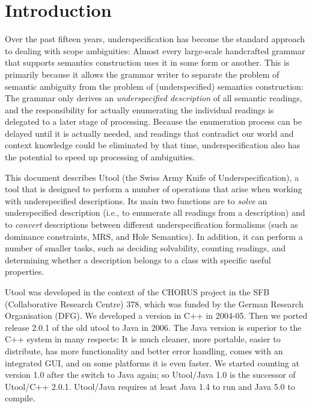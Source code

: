 
\section{Introduction}  \label{sec:introduction}

Over the past fifteen years, underspecification has become the
standard approach to dealing with scope ambiguities: Almost every
large-scale handcrafted grammar that supports semantics construction
uses it in some form or another. This is primarily because it allows
the grammar writer to separate the problem of semantic ambiguity from
the problem of (underspecified) semantics construction: The grammar
only derives an \emph{underspecified description} of all semantic
readings, and the responsibility for actually enumerating the
individual readings is delegated to a later stage of
processing. Because the enumeration process can be delayed until it is
actually needed, and readings that contradict our world and context
knowledge could be eliminated by that time, underspecification also
has the potential to speed up processing of ambiguities.

This document describes Utool (the Swiss Army Knife of
Underspecification), a tool that is designed to perform a number of
operations that arise when working with underspecified
descriptions. Its main two functions are to \emph{solve} an
underspecified description (i.e., to enumerate all readings from a
description) and to \emph{convert} descriptions between different
underspecification formalisms (such as dominance constraints, MRS, and
Hole Semantics). In addition, it can perform a number of smaller
tasks, such as deciding solvability, counting readings, and
determining whether a description belongs to a class with specific
useful properties.

Utool was developed in the context of the CHORUS project in the SFB
(Collaborative Research Centre) 378, which was funded by the German
Research Organisation (DFG). We developed a version in C++ in
2004-05. Then we ported release 2.0.1 of the old utool to Java in
2006. The Java version is superior to the C++ system in many respects:
It is much cleaner, more portable, easier to distribute, has more
functionality and better error handling, comes with an integrated GUI,
and on some platforms it is even faster. We started counting at
version 1.0 after the switch to Java again; so Utool/Java 1.0 is the
successor of Utool/C++ 2.0.1. Utool/Java requires at least Java 1.4 to
run and Java 5.0 to compile.

